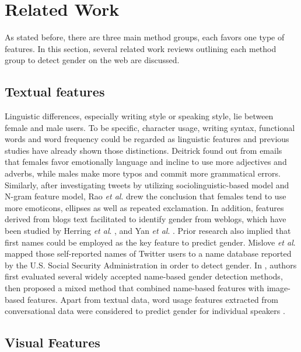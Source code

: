 \documentclass[runningheads]{llncs}
\begin{document}
	
	\section{Related Work}
	
	As stated before, there are three main method groups, each favors one type of features. In this section, several related work reviews outlining each method group to detect gender on the web are discussed. 
	
	\subsection{Textual features}
	
	Linguistic differences, especially writing style or speaking style, lie between female and male users. To be specific, character usage, writing syntax, functional words and word frequency could be regarded as linguistic features \cite{deitrick2012author} and previous studies have already shown those distinctions. Deitrick \cite{deitrick2012author} found out from emails that females favor emotionally language and incline to use more adjectives and adverbs, while males make more typos and commit more grammatical errors. Similarly, after investigating tweets by utilizing sociolinguistic-based model and N-gram feature model, Rao \textit{et al}. \cite{rao2010classifying} drew the conclusion that females tend to use more emoticons, ellipses as well as repeated exclamation. In addition, features derived from blogs text facilitated to identify gender from weblogs, which have been studied by Herring \textit{et al}. \cite{herring2004bridging}, and Yan \textit{et al}. \cite{yan2006gender}. Prior research also implied that first names could be employed as the key feature to predict gender. Mislove \textit{et al}. \cite{mislove2011understanding} mapped those self-reported names of Twitter users to a name database reported by the U.S. Social Security Administration in order to detect gender.  In \cite{karimi2016inferring}, authors first evaluated several widely accepted name-based gender detection methods, then proposed a mixed method that combined name-based features with image-based features. Apart from textual data, word usage features extracted from conversational data were considered to predict gender for individual speakers \cite{gillick2010can}.  
	
	\subsection{Visual Features}
	
\end{document}
